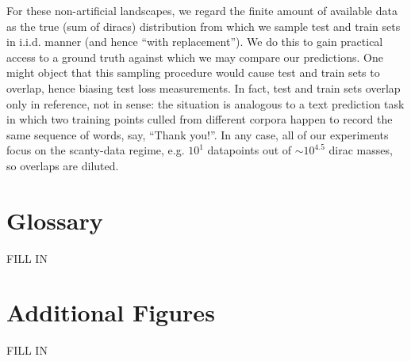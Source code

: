 \documentclass{article}
\begin{document}
    For these non-artificial landscapes, we regard the finite amount of
    available data as the true (sum of diracs) distribution from which we
    sample test and train sets in i.i.d.  manner (and hence ``with
    replacement'').  We do this to gain practical access to a ground truth
    against which we may compare our predictions.  One might object that this
    sampling procedure would cause test and train sets to overlap, hence
    biasing test loss measurements.  In fact, test and train sets overlap only
    in reference, not in sense: the situation is analogous to a text prediction
    task in which two training points culled from different corpora happen to
    record the same sequence of words, say, ``Thank you!''.  In any case, all
    of our experiments focus on the scanty-data regime, e.g. $10^1$ datapoints
    out of $\sim 10^{4.5}$ dirac masses, so overlaps are diluted. 

\section{Glossary}\label{sect:glossary}

    {\color{moor} FILL IN}

\section{Additional Figures}\label{sect:figures}

    {\color{moor} FILL IN}
\end{document}
